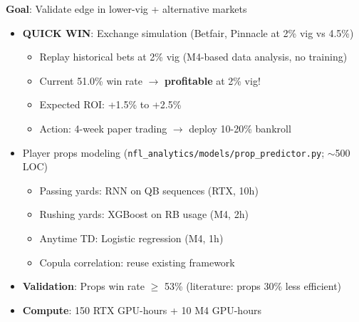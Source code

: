 \textbf{Goal}: Validate edge in lower-vig + alternative markets

\begin{itemize}
  \item {} \textbf{QUICK WIN}: Exchange simulation (Betfair, Pinnacle at 2\% vig vs 4.5\%)
  \begin{itemize}
    \item Replay historical bets at 2\% vig (M4-based data analysis, no training)
    \item Current 51.0\% win rate $\to$ \textbf{profitable} at 2\% vig!
    \item Expected ROI: +1.5\% to +2.5\%
    \item Action: 4-week paper trading $\to$ deploy 10-20\% bankroll
  \end{itemize}
  \item {} Player props modeling (\texttt{nfl\_analytics/models/prop\_predictor.py}; $\sim$500 LOC)
  \begin{itemize}
    \item Passing yards: RNN on QB sequences (RTX, 10h)
    \item Rushing yards: XGBoost on RB usage (M4, 2h)
    \item Anytime TD: Logistic regression (M4, 1h)
    \item Copula correlation: reuse existing framework
  \end{itemize}
  \item {} \textbf{Validation}: Props win rate $\ge$ 53\% (literature: props 30\% less efficient)
  \item \textbf{Compute}: 150 RTX GPU-hours + 10 M4 GPU-hours
\end{itemize}

